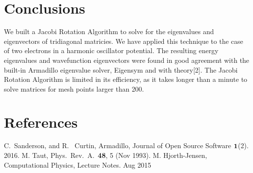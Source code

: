 \documentclass[10pt,showpacs,preprintnumbers,amsmath,amssymb,aps,prl,twocolumn,groupedaddress,superscriptaddress,showkeys]{revtex4-1}
\begin{document}
\section{Conclusions}
We built a Jacobi Rotation Algorithm to solve for the eigenvalues and eigenvectors of tridiagonal matricies. We have applied this technique to the case of two electrons in a harmonic oscillator potential. The resulting energy eigenvalues and wavefunction eigenvectors were found in good agreement with the built-in Armadillo eigenvalue solver, Eigensym and with theory[2]. The Jacobi Rotation Algorithm is limited in its efficiency, as it takes longer than a minute to solve matrices for mesh points larger than 200.   
\section{References}
\begin{thebibliography}{99}
 C.~Sanderson, and R.~ Curtin, Armadillo, Journal of Open Source Software $\bf{1}$(2). 2016.
 M. Taut,  Phys.~Rev.~A.~{\bf 48}, 5 (Nov 1993).
 M. Hjorth-Jensen, Computational Physics, Lecture Notes. Aug 2015
\end{thebibliography}


%
%	
\end{document}
